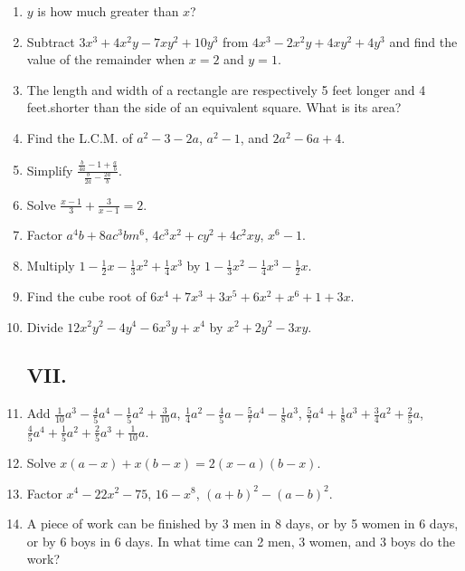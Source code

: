 \documentclass{book}
\begin{document}
\begin{enumerate}
\item $y$ is how much greater than $x$?

\item Subtract $3x^3+4x^2y-7xy^2+10y^3$ from $4x^3-2x^2y
+4xy^2+4y^3$ and find the value of the remainder when
$x=2$ and $y=1$.

\item The length and width of a rectangle are respectively
5 feet longer and 4 feet.shorter than the side of an equivalent
square. What is its area?

\item Find the L.C.M. of $a^2-3-2a$, $a^2-1$, and $2a^2
-6a + 4$.

\item Simplify $\displaystyle
\frac{\frac{b}{4a}-1+\frac{a}{b}}{\frac{b}{2a}-\frac{2a}{b}}$.

\item Solve $\displaystyle \frac{x-1}{3}+\frac{3}{x-1}=2$.

\item Factor $a^4b+8ac^3bm^6$, $4c^3x^2+cy^2+4c^2xy$, $x^6-1$.

\item Multiply $\displaystyle
1-\frac{1}{2}x-\frac{1}{3}x^2+\frac{1}{4}x^3$ by
$1-\frac{1}{3}x^2-\frac{1}{4}x^3-\frac{1}{2}x$.

\item Find the cube root of $6x^4+7x^3+3x^5+6x^2+x^6+1+3x$.

\item Divide $12x^2y^2- 4y^4 - 6x^3y + x^4$ by $x^2+2y^2-3xy$.

\subsection*{VII.}

\item Add $\frac{1}{10}a^3-\frac{4}{5}a^4-\frac{1}{5}a^2+\frac{3}{10}a$, $\frac{1}{4}a^2-\frac{4}{5}a-\frac{5}{7}a^4-\frac{1}{8}a^3$,
$\frac{5}{7}a^4+\frac{1}{8}a^3+\frac{3}{4}a^2+\frac{2}{5}a$, $\frac{4}{5}a^4+\frac{1}{5}a^2+\frac{2}{5}a^3+\frac{1}{10}a$.

\item Solve $x(a-x)+x(b-x)=2(x-a)(b-x)$.

\item Factor $x^4-22x^2-75$, $16-x^8$, $\left(a+b\right)^2-\left(a-b\right)^2$.

\item A piece of work can be finished by 3 men in 8 days,
or by 5 women in 6 days, or by 6 boys in 6 days. In what
time can 2 men, 3 women, and 3 boys do the work?


\end{enumerate}
\end{document}
